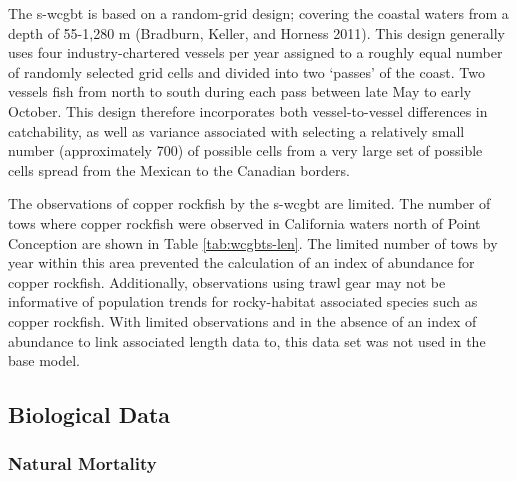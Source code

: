 \documentclass[11pt,
  english,
  a4paper,
]{article}
\begin{document}
\leavevmode\tagmcend\tagstructend


The \Gls{s-wcgbt} is based on a random-grid design; covering the coastal waters from a depth of 55-1,280 m {(Bradburn, Keller, and Horness 2011)\leavevmode\tagmcend\tagstructend}. This design generally uses four industry-chartered vessels per year assigned to a roughly equal number of randomly selected grid cells and divided into two `passes' of the coast. Two vessels fish from north to south during each pass between late May to early October. This design therefore incorporates both vessel-to-vessel differences in catchability, as well as variance associated with selecting a relatively small number (approximately 700) of possible cells from a very large set of possible cells spread from the Mexican to the Canadian borders.

\leavevmode\tagmcend\tagstructend\par


The observations of copper rockfish by the \Gls{s-wcgbt} are limited. The number of tows where copper rockfish were observed in California waters north of Point Conception are shown in Table \ref{tab:wcgbts-len}. The limited number of tows by year within this area prevented the calculation of an index of abundance for copper rockfish. Additionally, observations using trawl gear may not be informative of population trends for rocky-habitat associated species such as copper rockfish. With limited observations and in the absence of an index of abundance to link associated length data to, this data set was not used in the base model.

\leavevmode\tagmcend\tagstructend\par


\hypertarget{bio-data}{%
\subsection{Biological Data}\label{bio-data}}

\leavevmode\tagmcend\tagstructend


\hypertarget{natural-mortality}{%
\subsubsection{Natural Mortality}\label{natural-mortality}}
\end{document}
